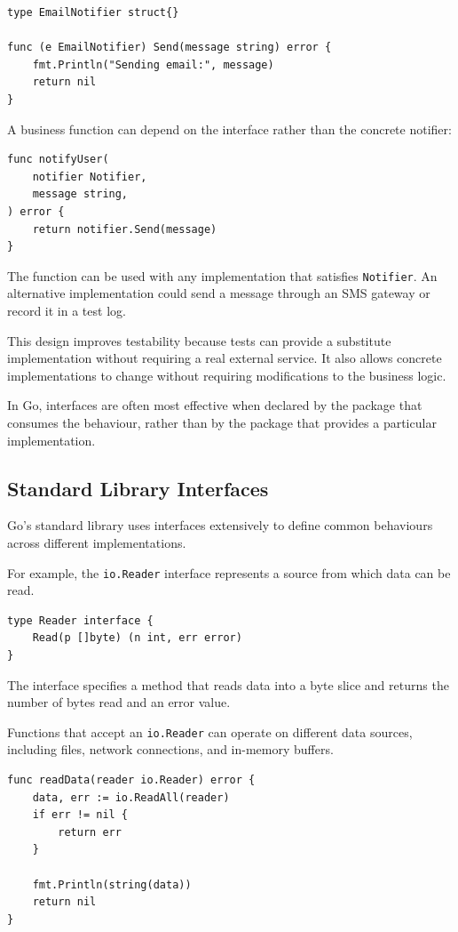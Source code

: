 \begin{lstlisting}
type EmailNotifier struct{}

func (e EmailNotifier) Send(message string) error {
    fmt.Println("Sending email:", message)
    return nil
}
\end{lstlisting}

A business function can depend on the interface rather than the concrete notifier:

\begin{lstlisting}
func notifyUser(
    notifier Notifier,
    message string,
) error {
    return notifier.Send(message)
}
\end{lstlisting}

The function can be used with any implementation that satisfies \texttt{Notifier}. An alternative implementation could send a message through an SMS gateway or record it in a test log.

This design improves testability because tests can provide a substitute implementation without requiring a real external service. It also allows concrete implementations to change without requiring modifications to the business logic.

In Go, interfaces are often most effective when declared by the package that consumes the behaviour, rather than by the package that provides a particular implementation.

\subsection{Standard Library Interfaces}

Go's standard library uses interfaces extensively to define common behaviours across different implementations.

For example, the \texttt{io.Reader} interface represents a source from which data can be read.

\begin{lstlisting}
type Reader interface {
    Read(p []byte) (n int, err error)
}
\end{lstlisting}

The interface specifies a method that reads data into a byte slice and returns the number of bytes read and an error value.

Functions that accept an \texttt{io.Reader} can operate on different data sources, including files, network connections, and in-memory buffers.

\begin{lstlisting}
func readData(reader io.Reader) error {
    data, err := io.ReadAll(reader)
    if err != nil {
        return err
    }

    fmt.Println(string(data))
    return nil
}
\end{lstlisting}

